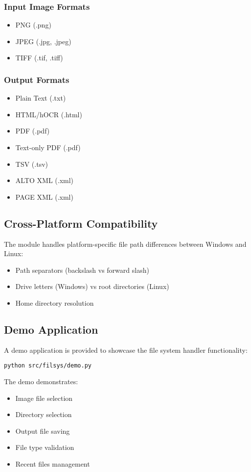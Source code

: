 \subsubsection{Input Image Formats}
\begin{itemize}
    \item PNG (.png)
    \item JPEG (.jpg, .jpeg)
    \item TIFF (.tif, .tiff)
\end{itemize}

\subsubsection{Output Formats}
\begin{itemize}
    \item Plain Text (.txt)
    \item HTML/hOCR (.html)
    \item PDF (.pdf)
    \item Text-only PDF (.pdf)
    \item TSV (.tsv)
    \item ALTO XML (.xml)
    \item PAGE XML (.xml)
\end{itemize}

\subsection{Cross-Platform Compatibility}

The module handles platform-specific file path differences between Windows and Linux:

\begin{itemize}
    \item Path separators (backslash vs forward slash)
    \item Drive letters (Windows) vs root directories (Linux)
    \item Home directory resolution
\end{itemize}

\subsection{Demo Application}

A demo application is provided to showcase the file system handler functionality:

\begin{verbatim}
python src/filsys/demo.py
\end{verbatim}

The demo demonstrates:
\begin{itemize}
    \item Image file selection
    \item Directory selection
    \item Output file saving
    \item File type validation
    \item Recent files management
\end{itemize} 